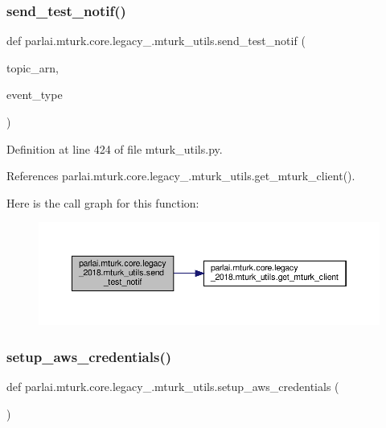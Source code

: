 \subsubsection{\texorpdfstring{send\+\_\+test\+\_\+notif()}{send\_test\_notif()}}
{\footnotesize\ttfamily def parlai.\+mturk.\+core.\+legacy\+\_.\+mturk\+\_\+utils.\+send\+\_\+test\+\_\+notif (\begin{DoxyParamCaption}\item[{}]{topic\+\_\+arn,  }\item[{}]{event\+\_\+type }\end{DoxyParamCaption})}



Definition at line 424 of file mturk\+\_\+utils.\+py.



References parlai.\+mturk.\+core.\+legacy\+\_.\+mturk\+\_\+utils.\+get\+\_\+mturk\+\_\+client().

Here is the call graph for this function\+:
\nopagebreak
\begin{figure}[H]
\begin{center}
\leavevmode
\includegraphics[width=350pt]{namespaceparlai_1_1mturk_1_1core_1_1legacy__2018_1_1mturk__utils_a6567af08013cf893310b91b3e1a946e5_cgraph}
\end{center}
\end{figure}
\mbox{\label{namespaceparlai_1_1mturk_1_1core_1_1legacy__2018_1_1mturk__utils_a6e138f202e17ae4a1fde82b5581e1822}} 
\subsubsection{\texorpdfstring{setup\+\_\+aws\+\_\+credentials()}{setup\_aws\_credentials()}}
{\footnotesize\ttfamily def parlai.\+mturk.\+core.\+legacy\+\_.\+mturk\+\_\+utils.\+setup\+\_\+aws\+\_\+credentials (\begin{DoxyParamCaption}{ }\end{DoxyParamCaption})}



